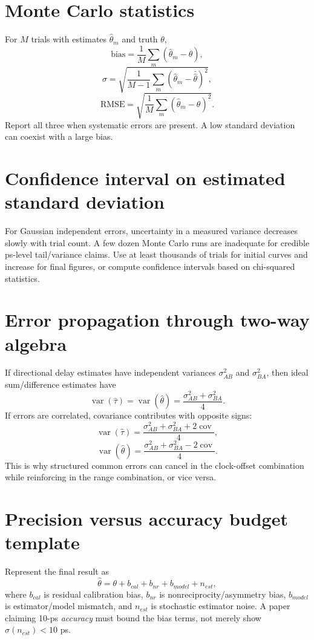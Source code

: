 \documentclass[11pt]{article}
\begin{document}
\section{Monte Carlo statistics}
For $M$ trials with estimates $\hat\theta_m$ and truth $\theta$,
\[
\text{bias}=\frac{1}{M}\sum_m(\hat\theta_m-\theta),
\]
\[
\sigma=\sqrt{\frac{1}{M-1}\sum_m(\hat\theta_m-\bar{\hat\theta})^2},
\]
\[
\mathrm{RMSE}=\sqrt{\frac{1}{M}\sum_m(\hat\theta_m-\theta)^2}.
\]
Report all three when systematic errors are present. A low standard deviation can coexist with a large bias.

\section{Confidence interval on estimated standard deviation}
For Gaussian independent errors, uncertainty in a measured variance decreases slowly with trial count. A few dozen Monte Carlo runs are inadequate for credible ps-level tail/variance claims. Use at least thousands of trials for initial curves and increase for final figures, or compute confidence intervals based on chi-squared statistics.

\section{Error propagation through two-way algebra}
If directional delay estimates have independent variances $\sigma_{AB}^2$ and $\sigma_{BA}^2$, then ideal sum/difference estimates have
\[
\operatorname{var}(\hat\tau)=\operatorname{var}(\hat\theta)=\frac{\sigma_{AB}^2+\sigma_{BA}^2}{4}.
\]
If errors are correlated, covariance contributes with opposite signs:
\[
\operatorname{var}(\hat\tau)=\frac{\sigma_{AB}^2+\sigma_{BA}^2+2\operatorname{cov}}{4},
\]
\[
\operatorname{var}(\hat\theta)=\frac{\sigma_{AB}^2+\sigma_{BA}^2-2\operatorname{cov}}{4}.
\]
This is why structured common errors can cancel in the clock-offset combination while reinforcing in the range combination, or vice versa.

\section{Precision versus accuracy budget template}
Represent the final result as
\[
\hat\theta=\theta+b_{cal}+b_{nr}+b_{model}+n_{est},
\]
where $b_{cal}$ is residual calibration bias, $b_{nr}$ is nonreciprocity/asymmetry bias, $b_{model}$ is estimator/model mismatch, and $n_{est}$ is stochastic estimator noise. A paper claiming 10-ps \emph{accuracy} must bound the bias terms, not merely show $\sigma(n_{est})<10$ ps.
\end{document}
